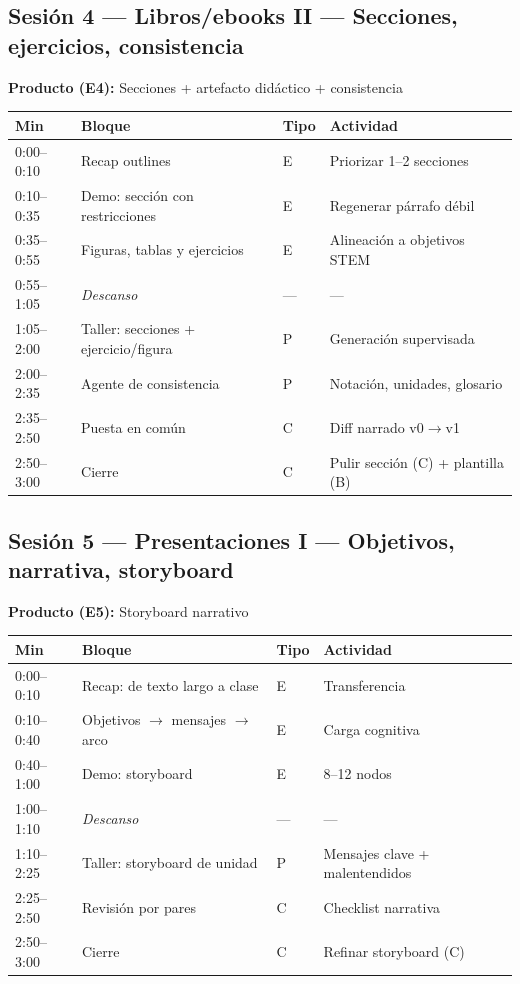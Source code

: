 \subsection{Sesión 4 --- Libros/ebooks II --- Secciones, ejercicios, consistencia}
\textbf{Producto (E4):} Secciones + artefacto didáctico + consistencia

\begin{tabularx}{\textwidth}{@{}lllX@{}}
\toprule
Min & Bloque & Tipo & Actividad \\
\midrule
0:00--0:10 & Recap outlines & E & Priorizar 1--2 secciones \\
0:10--0:35 & Demo: sección con restricciones & E & Regenerar párrafo débil \\
0:35--0:55 & Figuras, tablas y ejercicios & E & Alineación a objetivos STEM \\
0:55--1:05 & \emph{Descanso} & --- & --- \\
1:05--2:00 & Taller: secciones + ejercicio/figura & P & Generación supervisada \\
2:00--2:35 & Agente de consistencia & P & Notación, unidades, glosario \\
2:35--2:50 & Puesta en común & C & Diff narrado v0$\rightarrow$v1 \\
2:50--3:00 & Cierre & C & Pulir sección (C) + plantilla (B) \\
\bottomrule
\end{tabularx}

\subsection{Sesión 5 --- Presentaciones I --- Objetivos, narrativa, storyboard}
\textbf{Producto (E5):} Storyboard narrativo

\begin{tabularx}{\textwidth}{@{}lllX@{}}
\toprule
Min & Bloque & Tipo & Actividad \\
\midrule
0:00--0:10 & Recap: de texto largo a clase & E & Transferencia \\
0:10--0:40 & Objetivos $\rightarrow$ mensajes $\rightarrow$ arco & E & Carga cognitiva \\
0:40--1:00 & Demo: storyboard & E & 8--12 nodos \\
1:00--1:10 & \emph{Descanso} & --- & --- \\
1:10--2:25 & Taller: storyboard de unidad & P & Mensajes clave + malentendidos \\
2:25--2:50 & Revisión por pares & C & Checklist narrativa \\
2:50--3:00 & Cierre & C & Refinar storyboard (C) \\
\bottomrule
\end{tabularx}

